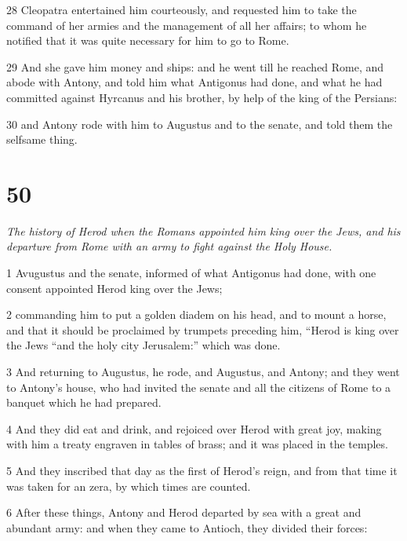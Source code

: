 \par 28 Cleopatra entertained him courteously, and requested him to take the command of her armies and the management of all her affairs; to whom he notified that it was quite necessary for him to go to Rome. 

\par 29 And she gave him money and ships: and he went till he reached Rome, and abode with Antony, and told him what Antigonus had done, and what he had committed against Hyrcanus and his brother, by help of the king of the Persians: 

\par 30 and Antony rode with him to Augustus and to the senate, and told them the selfsame thing. 

\chapter{50}

\par \textit{The history of Herod when the Romans appointed him king over the Jews, and his departure from Rome with an army to fight against the Holy House.}

\par 1 Avugustus and the senate, informed of what Antigonus had done, with one consent appointed Herod king over the Jews; 

\par 2 commanding him to put a golden diadem on his head, and to mount a horse, and that it should be proclaimed by trumpets preceding him, “Herod is king over the Jews “and the holy city Jerusalem:” which was done. 

\par 3 And returning to Augustus, he rode, and Augustus, and Antony; and they went to Antony’s house, who had invited the senate and all the citizens of Rome to a banquet which he had prepared. 

\par 4 And they did eat and drink, and rejoiced over Herod with great joy, making with him a treaty engraven in tables of brass; and it was placed in the temples. 

\par 5 And they inscribed that day as the first of Herod’s reign, and from that time it was taken for an zera, by which times are counted. 

\par 6 After these things, Antony and Herod departed by sea with a great and abundant army: and when they came to Antioch, they divided their forces: 

